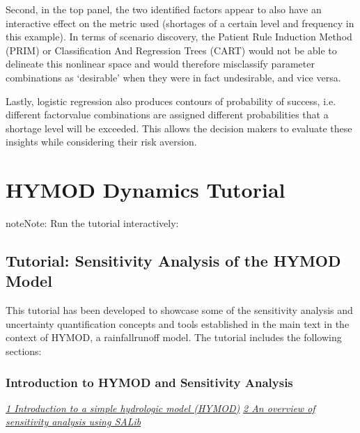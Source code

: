 \documentclass[letterpaper,10pt,english]{book}
\begin{document}
\sphinxAtStartPar
Second, in the top panel, the two identified factors appear to also have
an interactive effect on the metric used (shortages of a certain level
and frequency in this example). In terms of scenario discovery, the
Patient Rule Induction Method (PRIM) or Classification And Regression
Trees (CART) would not be able to delineate this non\sphinxhyphen{}linear space and
would therefore misclassify parameter combinations as ‘desirable’ when
they were in fact undesirable, and vice versa.

\sphinxAtStartPar
Lastly, logistic regression also produces contours of probability of
success, i.e. different factor\sphinxhyphen{}value combinations are assigned different
probabilities that a shortage level will be exceeded. This allows the
decision makers to evaluate these insights while considering their risk
aversion.


\section{HYMOD Dynamics Tutorial}
\label{\detokenize{A2_Jupyter_Notebooks:hymod-dynamics-tutorial}}
\begin{sphinxadmonition}{note}{Note:}
\sphinxAtStartPar
Run the tutorial interactively:  
\end{sphinxadmonition}


\subsection{Tutorial: Sensitivity Analysis of the HYMOD Model}
\label{\detokenize{A2_Jupyter_Notebooks:tutorial-sensitivity-analysis-of-the-hymod-model}}
\sphinxAtStartPar
This tutorial has been developed to showcase some of the sensitivity
analysis and uncertainty quantification concepts and tools established
in the main text in the context of HYMOD, a rainfall\sphinxhyphen{}runoff model. The
tutorial includes the following sections:


\subsubsection{Introduction to HYMOD and Sensitivity Analysis}
\label{\detokenize{A2_Jupyter_Notebooks:introduction-to-hymod-and-sensitivity-analysis}}
\sphinxAtStartPar
{\hyperref[\detokenize{A2_Jupyter_Notebooks:hymod}]{\emph{1\sphinxhyphen{} Introduction to a simple hydrologic model (HYMOD)}}} {\hyperref[\detokenize{A2_Jupyter_Notebooks:sensitivity}]{\emph{2\sphinxhyphen{} An
overview of sensitivity analysis using SALib}}} 
\end{document}
